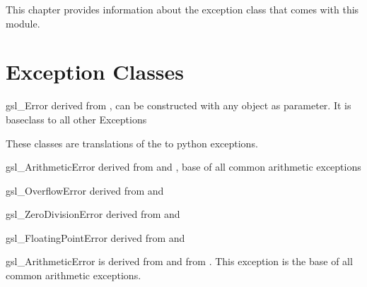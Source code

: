 
This chapter provides information about the  exception class that comes with this module.

\section{Exception Classes}


\begin{excclassdesc} {gsl_Error}{}
derived from , can be constructed with any object as parameter.
It is baseclass to all other \gsl{} Exceptions
\end{excclassdesc}
These classes are translations of the  to python
exceptions.


\begin{excclassdesc}{gsl_ArithmeticError}{}
derived from  and ,
base of all common arithmetic exceptions
\end{excclassdesc}

\begin{excclassdesc}{gsl_OverflowError}{}
derived from  and 
\end{excclassdesc}

\begin{excclassdesc}{gsl_ZeroDivisionError}{}
derived from  and 
\end{excclassdesc}

\begin{excclassdesc}{gsl_FloatingPointError}{}
derived from  and 
\end{excclassdesc}

\begin{excclassdesc}{gsl_ArithmeticError}{}
is derived from   and from   .
This exception is the    base of all common arithmetic exceptions.
\end{excclassdesc}

